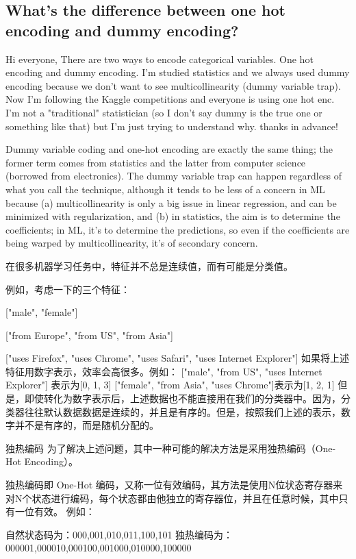 \documentclass[10pt,a4paper]{ctexbook}
\begin{document}
\subsection{What's the difference between one hot encoding and dummy encoding?}
Hi everyone,
There are two ways to encode categorical variables. One hot encoding and dummy encoding. I'm studied statistics and we always used dummy encoding because we don't want to see multicollinearity (dummy variable trap). Now I'm following the Kaggle competitions and everyone is using one hot enc. I'm not a "traditional" statistician (so I don't say dummy is the true one or something like that) but I'm just trying to understand why.
thanks in advance!

Dummy variable coding and one-hot encoding are exactly the same thing; the former term comes from statistics and the latter from computer science (borrowed from electronics).
The dummy variable trap can happen regardless of what you call the technique, although it tends to be less of a concern in ML because (a) multicollinearity is only a big issue in linear regression, and can be minimized with regularization, and (b) in statistics, the aim is to determine the coefficients; in ML, it's to determine the predictions, so even if the coefficients are being warped by multicollinearity, it's of secondary concern.




在很多机器学习任务中，特征并不总是连续值，而有可能是分类值。

例如，考虑一下的三个特征：

["male", "female"]

["from Europe", "from US", "from Asia"]

["uses Firefox", "uses Chrome", "uses Safari", "uses Internet Explorer"]
如果将上述特征用数字表示，效率会高很多。例如：
["male", "from US", "uses Internet Explorer"] 表示为[0, 1, 3]
["female", "from Asia", "uses Chrome"]表示为[1, 2, 1]
但是，即使转化为数字表示后，上述数据也不能直接用在我们的分类器中。因为，分类器往往默认数据数据是连续的，并且是有序的。但是，按照我们上述的表示，数字并不是有序的，而是随机分配的。

独热编码
为了解决上述问题，其中一种可能的解决方法是采用独热编码（One-Hot Encoding）。

独热编码即 One-Hot 编码，又称一位有效编码，其方法是使用N位状态寄存器来对N个状态进行编码，每个状态都由他独立的寄存器位，并且在任意时候，其中只有一位有效。
例如：

自然状态码为：000,001,010,011,100,101
独热编码为：000001,000010,000100,001000,010000,100000
\end{document}
